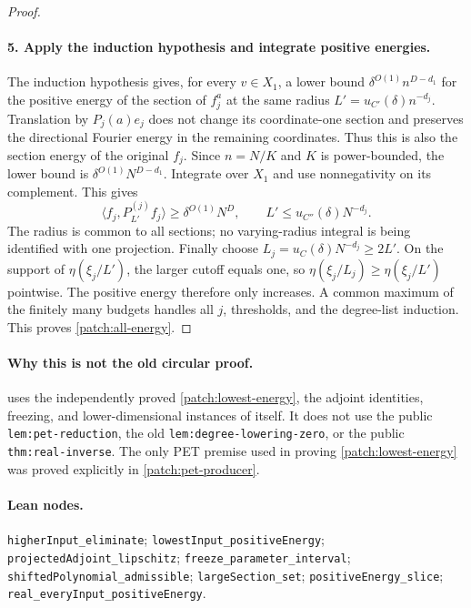 \documentclass[11pt]{article}
\theoremstyle{definition}
\newcommand{\pid}[1]{\nolinkurl{#1}}
\begin{document}
\begin{proof}
\paragraph{5. Apply the induction hypothesis and integrate positive energies.}
The induction hypothesis gives, for every $v\in X_1$, a lower bound
$\delta^{O(1)}n^{D-d_1}$ for the positive energy of the section of $f_j^a$ at the same
radius $L'=u_{C'}(\delta)n^{-d_j}$.  Translation by $P_j(a)e_j$ does not change its
coordinate-one section and preserves the directional Fourier energy in the remaining
coordinates.  Thus this is also the section energy of the original $f_j$.
Since $n=N/K$ and $K$ is power-bounded, the lower bound is
$\delta^{O(1)}N^{D-d_1}$.
Integrate over $X_1$ and use nonnegativity on its complement.  This gives
\[
 \langle f_j,P_{L'}^{(j)}f_j\rangle\geq\delta^{O(1)}N^D,
 \qquad L'\leq u_{C''}(\delta)N^{-d_j}.
\]
The radius is common to all sections; no varying-radius integral is being identified with
one projection.
Finally choose $L_j=u_C(\delta)N^{-d_j}\geq2L'$.  On the support of
$\eta(\xi_j/L')$, the larger cutoff equals one, so
$\eta(\xi_j/L_j)\geq\eta(\xi_j/L')$ pointwise.
The positive energy therefore only increases.  A common maximum of the finitely many
budgets handles all $j$, thresholds, and the degree-list induction.
This proves \eqref{patch:all-energy}.
\end{proof}

\paragraph{Why this is not the old circular proof.}
 uses the independently proved \cref{patch:lowest-energy}, the
adjoint identities, freezing, and lower-dimensional instances of itself.
It does not use the public \pid{lem:pet-reduction}, the old \pid{lem:degree-lowering-zero},
or the public \pid{thm:real-inverse}.  The only PET premise used in proving
\cref{patch:lowest-energy} was proved explicitly in \cref{patch:pet-producer}.
\paragraph{Lean nodes.}
\mbox{}\par
{\small\raggedright
\pid{higherInput_eliminate}; \pid{lowestInput_positiveEnergy};
\pid{projectedAdjoint_lipschitz}; \pid{freeze_parameter_interval};
\pid{shiftedPolynomial_admissible}; \pid{largeSection_set};
\pid{positiveEnergy_slice}; \pid{real_everyInput_positiveEnergy}.
\par}
\end{document}
